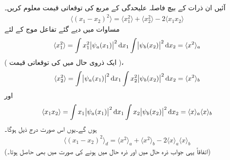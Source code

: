 آئیں ان ذرات کے بیچ فاصلہ  علیحدگی  کے مربع کی توقعاتی قیمت معلوم کریں۔
\begin{align}
	\langle(x_1-x_2)^2\rangle=\langle x^2_1\rangle+\langle x_2^2\rangle-2\langle x_1x_2\rangle
\end{align}
 مساوات   میں دیے گئے  تفاعل موج کے لئے
\begin{align*}
	\langle x_1^2\rangle=\int x_1^2\abs{\psi_a(x_1)}^2\dif x_1\int\abs{\psi_b(x_2)}^2\dif x_2=\langle x^2\rangle_a
\end{align*}
 ( ایک ذروی حال  میں  کی توقعاتی قیمت )، 
\begin{align*}
	\langle x_2^2\rangle=\int\abs{\psi_a(x_1)}^2\dif x_1\int x_2^2\abs{\psi_b(x_2)}^2\dif x_2=\langle x^2\rangle_b
\end{align*}
اور
\begin{align*}
	\langle x_1x_2 \rangle=\int x_1\abs{\psi_a(x_1)}^2\dif x_1\int x_2\abs{\psi_b(x_2)}^2\dif x_2=\langle x\rangle_a\langle x \rangle_b
\end{align*}
ہوں گے۔یوں اس صورت درج ذیل ہوگا۔
\begin{align}\label{مساوات_متماثل_قابل_ممیز_فاصلہ}
	\langle(x_1-x_2)^2\rangle_{d}=\langle x^2\rangle_a+\langle x^2 \rangle_b-2\langle x \rangle_a\langle x \rangle_b
\end{align}
(اتفاقاً یہی جواب ذرہ  حال  میں اور ذرہ  حال  میں ہونے کی صورت میں بھی حاصل ہوتا۔)

